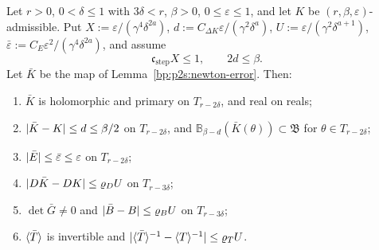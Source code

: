 \begin{proposition}\label{bp:p2s:step}
Let $r>0$, $0<\delta\le1$ with $3\delta<r$, $\beta>0$, $0\le\varepsilon\le1$, and let $K$ be $(r,\beta,\varepsilon)$-admissible.
Put $X:=\varepsilon/(\gamma^4\delta^{2a})$, $d:=C_{\Delta K}\varepsilon/(\gamma^2\delta^a)$, $U:=\varepsilon/(\gamma^2\delta^{a+1})$,
$\bar\varepsilon:=C_E\varepsilon^2/(\gamma^4\delta^{2a})$, and assume
\[
\mathfrak c_{\mathrm{step}}X\le1,\qquad2d\le\beta.
\]
Let $\bar K$ be the map of Lemma~\ref{bp:p2s:newton-error}. Then:
\begin{enumerate}[label=(\alph*)]
\item $\bar K$ is holomorphic and primary on $T_{r-2\delta}$, and real on reals;
\item $\lvert \bar K-K\rvert\le d\le\beta/2$ on $T_{r-2\delta}$, and $\mathbb B_{\beta-d}(\bar K(\theta))\subset\mathfrak B$ for $\theta\in T_{r-2\delta}$;
\item $\lvert \bar E\rvert\le\bar\varepsilon\le\varepsilon$ on $T_{r-2\delta}$;
\item $\lvert D\bar K-DK\rvert\le\varrho_DU$ on $T_{r-3\delta}$;
\item $\det\bar G\ne0$ and $\lvert \bar B-B\rvert\le\varrho_BU$ on $T_{r-3\delta}$;
\item $\langle \bar T\rangle$ is invertible and $\lvert \langle \bar T\rangle^{-1}-\langle T\rangle^{-1}\rvert\le\varrho_TU$.
\end{enumerate}
\end{proposition}

